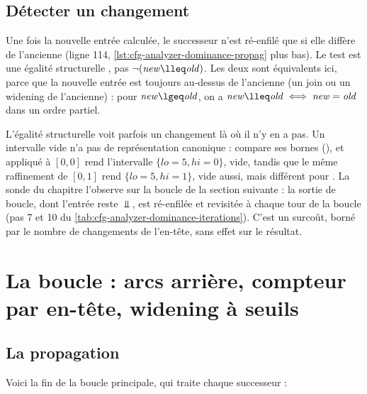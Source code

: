 \subsection{Détecter un changement}

Une fois la nouvelle entrée calculée, le successeur n'est ré-enfilé que si elle
diffère de l'ancienne (ligne 114, \cref{lst:cfg-analyzer-dominance-propag}
plus bas). Le test est une égalité structurelle \code{!=}, pas
$\neg(\mathit{new} \lleq \mathit{old})$. Les deux sont équivalents ici, parce
que la nouvelle entrée est toujours au-dessus de l'ancienne (un join ou un
widening de l'ancienne) : pour $\mathit{new} \lgeq \mathit{old}$, on a
$\mathit{new} \lleq \mathit{old} \iff \mathit{new} = \mathit{old}$ dans un
ordre partiel.

\begin{remarque}
  L'égalité structurelle voit parfois un changement là où il n'y en a pas.
  Un intervalle vide n'a pas de représentation canonique : 
  compare ses bornes (), et
   appliqué à $[0,0]$ rend l'intervalle $\{lo = 5, hi =
  0\}$, vide, tandis que le même raffinement de $[0,1]$ rend $\{lo = 5, hi =
  1\}$, vide aussi, mais différent pour \code{==}. La sonde du chapitre
  l'observe sur la boucle de la section suivante : la sortie de boucle, dont
  l'entrée reste $\Bot$, est ré-enfilée et revisitée à chaque tour de la
  boucle (pas 7 et 10 du \cref{tab:cfg-analyzer-dominance-iterations}). C'est
  un surcoût, borné par le nombre de changements de l'en-tête, sans effet
  sur le résultat.
\end{remarque}

\section{La boucle : arcs arrière, compteur par en-tête, widening à seuils}
\label{sec:cfg-analyzer-dominance-boucle}

\subsection{La propagation}

Voici la fin de la boucle principale, qui traite chaque successeur :


